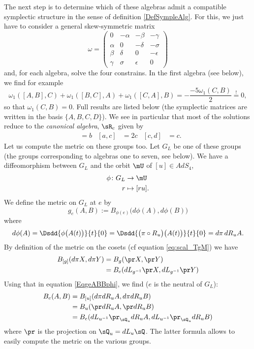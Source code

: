  The next step is to determine which of these algebras admit a compatible symplectic structure in the sense of definition \ref{DefSympleAlg}. 
 For this, we just have to consider a general skew-symmetric matrix
\[
  \omega=
\begin{pmatrix}
0&-\alpha&-\beta&-\gamma\\
\alpha&0&-\delta&-\sigma\\
\beta&\delta&0&-\epsilon\\
\gamma&\sigma&\epsilon&0
\end{pmatrix}
\]
 and, for each algebra, solve the four constrains. In the first algebra (see below), we find for example
\[
  \omega_{1}([A,B],C)+\omega_{1}([B,C],A)+\omega_{1}([C,A],B)=-\frac{ -5\omega_{1}(C,B) }{ 2 }\stackrel{!}{=}0,
\]
so that $\omega_{1}(C,B)=0$. Full results are listed below (the symplectic matrices are written in the basis $\{ A,B,C,D \}$).  We see in particular that most of the solutions reduce to the \emph{canonical algebra}, $\sR_c$ given by
\begin{align*}  
[a,b]&=b
&[a,c]&=2c
&[c,d]&=c.
\end{align*}
Let us compute the metric on these groups too. Let $G_{L}$ be one of these groups (the groups corresponding to algebras one to seven, see below). We have a diffeomorphism between $G_{L}$ and the orbit $\mU$ of $[u]\in AdS_4$,
\begin{equation}
\begin{aligned}
 \phi\colon G_{L}&\to \mU \\
r&\mapsto [ru].
\end{aligned}
\end{equation}
We define the metric on $G_{L}$ at $e$ by
\begin{equation}   \label{EqgeABBphi}
  g_{e}(A,B):=B_{\phi(e)}\big( d\phi(A),d\phi(B) \big)
\end{equation}
where
\[
  d\phi(A)=\Dsdd{ \phi\big( A(t) \big) }{t}{0}=\Dsdd{ \big( \pi\circ R_{u} \big)\big( A(t) \big) }{t}{0}=d\pi\,dR_{u}A.
\]
By definition of the metric on the cosets (cf equation \eqref{eq:scal_TgM}) we have
\begin{align*}
B_{[g]}(d\pi X,d\pi Y)&=B_{g}(\pr X,\pr Y)\\
        &=B_{e}(dL_{g^{-1}}\pr X,dL_{g^{-1}}\pr Y)
\end{align*}
Using that in equation \eqref{EqgeABBphi}, we find ($e$ is the neutral of $G_{L}$):
 \[
\begin{split}
  B_{e}(A,B)&=B_{[u]}(d\pi dR_{u}A,d\pi dR_{u}B)\\
        &=B_{u}(\pr dR_{u}A,\pr dR_{u}B)\\
        &=B_{e}(dL_{u^{-1}}\pr_{\sQ_{u}}dR_{u}A,dL_{u^{-1}}\pr_{\sQ_{u}}dR_{u}B)
\end{split}
\]
where $\pr$ is the projection on $\sQ_{u}=dL_{u}\sQ$. The latter formula allows to easily compute the metric on the various groups.

